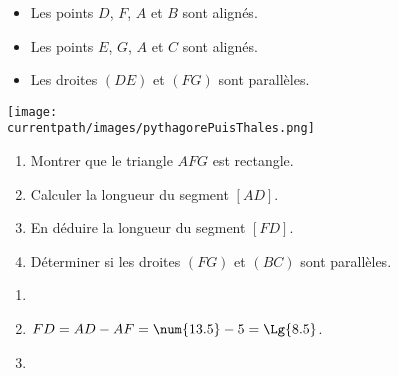 \begin{exercice*}
    \begin{itemize}
        \item Les points $D$, $F$, $A$ et $B$ sont alignés.
        \item Les points $E$, $G$, $A$ et $C$ sont alignés.
        \item Les droites $(DE)$ et $(FG)$ sont parallèles.
    \end{itemize}

    \begin{minipage}{1\linewidth}
    \begin{center}
        \texttt{[image: \\currentpath/images/pythagorePuisThales.png]}    
    \end{center}
    \end{minipage}    

    \begin{enumerate}
        \item Montrer que le triangle $AFG$ est rectangle.
        \item Calculer la longueur du segment $[AD]$.
        \item En déduire la longueur du segment $[FD]$.
        \item Déterminer si les droites $(FG)$ et $(BC)$ sont parallèles.        
    \end{enumerate}
\end{exercice*}
\begin{corrige}

    \begin{enumerate}
        \item {}
        \item {}
        
        $FD=AD-AF=\num{13.5}-5=\Lg{8.5}$.
        \item {}
    \end{enumerate}
\end{corrige}



